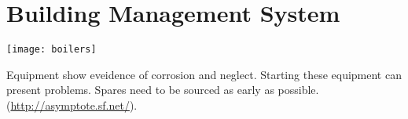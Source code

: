\chapter{Building Management System}

\begin{marginfigure}%
  \texttt{[image: boilers]}
  \caption{Equipment show eveidence of corrosion and neglect. Starting these equipment can present problems. Spares need to be sourced as early as possible.(\url{http://asymptote.sf.net/}).}
  \label{fig:marginfig1}
\end{marginfigure}

